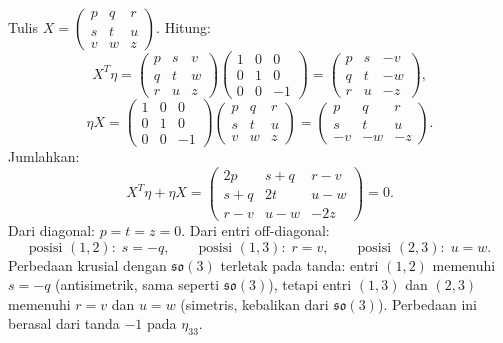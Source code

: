 \vspace{0.5em}
Tulis $X = \begin{pmatrix}p&q&r\\s&t&u\\v&w&z\end{pmatrix}$. Hitung:
\begin{equation}
    X^T\eta = \begin{pmatrix}p&s&v\\q&t&w\\r&u&z\end{pmatrix}\!\begin{pmatrix}1&0&0\\0&1&0\\0&0&-1\end{pmatrix}
    = \begin{pmatrix}p&s&-v\\q&t&-w\\r&u&-z\end{pmatrix},
\end{equation}
\begin{equation}
    \eta X = \begin{pmatrix}1&0&0\\0&1&0\\0&0&-1\end{pmatrix}\!\begin{pmatrix}p&q&r\\s&t&u\\v&w&z\end{pmatrix}
    = \begin{pmatrix}p&q&r\\s&t&u\\-v&-w&-z\end{pmatrix}.
\end{equation}
Jumlahkan:
\begin{equation}\label{a2-eq:XetaX}
    X^T\eta + \eta X = \begin{pmatrix}2p & s+q & r-v \\ s+q & 2t & u-w \\ r-v & u-w & -2z\end{pmatrix} = 0.
\end{equation}
Dari diagonal: $p = t = z = 0$. Dari entri off-diagonal:
\begin{equation}
    \text{posisi }(1,2):\; s = -q, \qquad
    \text{posisi }(1,3):\; r = v, \qquad
    \text{posisi }(2,3):\; u = w.
\end{equation}
Perbedaan krusial dengan $\mathfrak{so}(3)$ terletak pada tanda: entri $(1,2)$ memenuhi $s = -q$ (antisimetrik, sama seperti $\mathfrak{so}(3)$), tetapi entri $(1,3)$ dan $(2,3)$ memenuhi $r = v$ dan $u = w$ (simetris, kebalikan dari $\mathfrak{so}(3)$). Perbedaan ini berasal dari tanda $-1$ pada $\eta_{33}$.

